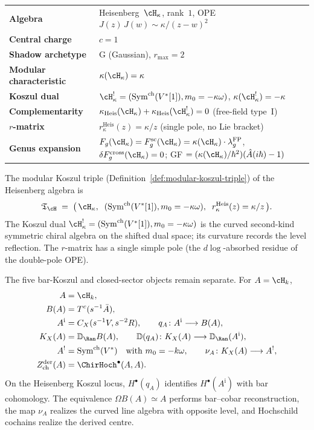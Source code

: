 \begin{center}
\renewcommand{\arraystretch}{1.3}
\begin{tabular}{ll}
\textbf{Algebra} & Heisenberg~$\cH_\kappa$, rank~$1$,
OPE $J(z)\,J(w) \sim \kappa/(z{-}w)^2$ \\
\textbf{Central charge} & $c = 1$ \\
\textbf{Shadow archetype} & G (Gaussian), $r_{\max} = 2$ \\
\textbf{Modular characteristic} & $\kappa(\cH_\kappa) = \kappa$ \\
\textbf{Koszul dual} & $\cH_\kappa^!=(\operatorname{Sym}^{\mathrm{ch}}(V^*[1]),m_0=-\kappa\omega)$,
$\kappa(\cH_\kappa^!) = -\kappa$ \\
\textbf{Complementarity} & $\kappa_{\mathrm{Heis}}(\cH_\kappa) + \kappa_{\mathrm{Heis}}(\cH_\kappa^!) = 0$ \textup{(}free-field type~I\textup{)} \\
\textbf{$r$-matrix} & $r^{\mathrm{Heis}}_\kappa(z) = \kappa/z$ (single pole, no Lie bracket) \\
\textbf{Genus expansion} &
$F_g(\cH_\kappa)=F_g^{\mathrm{sc}}(\cH_\kappa)
= \kappa(\cH_\kappa)\cdot\lambda_g^{\mathrm{FP}}$,
$\delta F_g^{\mathrm{cross}}(\cH_\kappa)=0$; GF
$= (\kappa(\cH_\kappa)/\hbar^2)(\hat{A}(i\hbar) - 1)$
\end{tabular}
\end{center}

\noindent
The modular Koszul triple
(Definition~\ref{def:modular-koszul-triple}) of the Heisenberg
algebra is
\begin{equation}\label{eq:heisenberg-triple}
\mathfrak{T}_{\cH}
\;=\;
\bigl(\,\cH_\kappa,\;\;
(\operatorname{Sym}^{\mathrm{ch}}(V^*[1]),m_0=-\kappa\omega),\;\;
r^{\mathrm{Heis}}_\kappa(z) = \kappa/z\,\bigr).
\end{equation}
The Koszul dual $\cH_\kappa^! =
(\operatorname{Sym}^{\mathrm{ch}}(V^*[1]),m_0=-\kappa\omega)$ is
the curved second-kind symmetric chiral algebra on the shifted dual
space; its curvature records the level reflection.  The $r$-matrix
has a single simple pole
(the $d\log$-absorbed residue of the double-pole OPE).

The five bar-Koszul and closed-sector objects remain separate. For
$A=\cH_k$,
\[
\begin{aligned}
A&=\cH_k,\\
B(A)&=T^c(s^{-1}\bar A),\\
A^{\mathrm{i}}&=C_X(s^{-1}V,s^{-2}R),\qquad
q_A\colon A^{\mathrm i}\longrightarrow B(A),\\
K_X(A)&=\mathbb{D}_{\Ran}B(A),\qquad
\mathbb D(q_A)\colon K_X(A)\longrightarrow
\mathbb D_{\Ran}(A^{\mathrm i}),\\
A^!&=\operatorname{Sym}^{\mathrm{ch}}(V^*)
   \quad\text{with }m_0=-k\omega,\qquad
\nu_A\colon K_X(A)\longrightarrow A^!,\\
Z^{\mathrm{der}}_{\mathrm{ch}}(A)
&=\ChirHoch^\bullet(A,A).
\end{aligned}
\]
On the Heisenberg Koszul locus, $H^\bullet(q_A)$ identifies
$H^\bullet(A^{\mathrm i})$ with bar cohomology.  The equivalence
$\Omega B(A)\simeq A$ performs bar--cobar reconstruction, the map
$\nu_A$ realizes the curved line algebra with opposite level, and
Hochschild cochains realize the derived centre.

